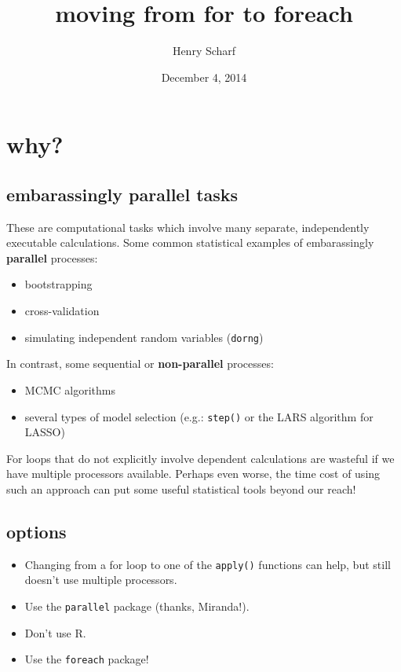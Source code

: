 \documentclass[]{article}
\title{moving from for to foreach}
\author{Henry Scharf}
\date{December 4, 2014}
\begin{document}
\maketitle


{
\hypersetup{linkcolor=black}
\setcounter{tocdepth}{2}
\tableofcontents
}
\section{why?}\label{why}

\subsection{embarassingly parallel
tasks}\label{embarassingly-parallel-tasks}

These are computational tasks which involve many separate, independently
executable calculations. Some common statistical examples of
embarassingly {\textbf{parallel}} processes:

\begin{itemize}
\itemsep1pt\parskip0pt
\item
  bootstrapping
\item
  cross-validation
\item
  simulating independent random variables (\texttt{dorng})
\end{itemize}

In contrast, some sequential or {\textbf{non-parallel}} processes:

\begin{itemize}
\itemsep1pt\parskip0pt
\item
  MCMC algorithms
\item
  several types of model selection (e.g.: \texttt{step()} or the LARS
  algorithm for LASSO)
\end{itemize}

For loops that do not explicitly involve dependent calculations are
wasteful if we have multiple processors available. Perhaps even worse,
the time cost of using such an approach can put some useful statistical
tools beyond our reach!

\subsection{options}\label{options}

\begin{itemize}
\itemsep1pt\parskip0pt
\item
  Changing from a for loop to one of the \texttt{apply()} functions can
  help, but still doesn't use multiple processors.
\item
  Use the \texttt{parallel} package (thanks, Miranda!).
\item
  Don't use R.
\item
  Use the \texttt{foreach} package!
\end{itemize}
\end{document}
